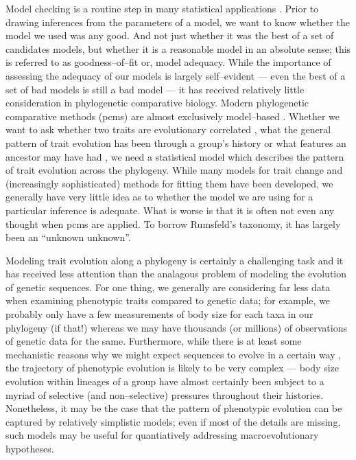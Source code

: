 \documentclass[12pt]{article}
\begin{document}
\noindent Model checking is a routine step in many statistical applications \citep[e.g.][ch. 6]{Gelmanbook}. Prior to drawing inferences from the parameters of a model, we want to know whether the model we used was any good. And not just whether it was the best of a set of candidates models, but whether it is a reasonable model in an absolute sense; this is referred to as goodness--of--fit or, model adequacy. While the importance of assessing the adequacy of our models is largely self--evident --- even the best of a set of bad models is still a bad model --- it has received relatively little consideration in phylogenetic comparative biology. Modern phylogenetic comparative methods (pcms) are almost exclusively model--based \citep[recently reviewed in][]{Omeara2012, PennellHarmon}. Whether we want to ask whether two traits are evolutionary correlated \citep[e.g.][]{Felsenstein1985, Grafen1989, HarveyPagel1991}, what the general pattern of trait evolution has been through a group's history \citep[e.g.][]{Mooers1999, Harmon2010, Hunt2012} or what features an ancestor may have had \citep[e.g.][]{Schluter1997, Huelsenbeck2003}, we need a statistical model which describes the pattern of trait evolution across the phylogeny. While many models for trait change and (increasingly sophisticated) methods for fitting them have been developed, we generally have very little idea as to whether the model we are using for a particular inference is adequate. What is worse is that it is often not even any thought when pcms are applied. To borrow Rumsfeld's taxonomy, it has largely been an ``unknown unknown''.

Modeling trait evolution along a phylogeny is certainly a challenging task and it has received less attention than the analagous problem of modeling the evolution of genetic sequences. For one thing, we generally are considering far less data when examining phenotypic traits compared to genetic data; for example, we probably only have a few  measurements of body size for each taxa in our phylogeny (if that!) whereas we may have thousands (or millions) of observations of genetic data for the same. Furthermore, while there is at least some mechanistic reasons why we might expect sequences to evolve in a certain way \citep{Kimura1983, Ohna1970, Wakeley2008}, the trajectory of phenotypic evolution is likely to be very complex --- body size evolution within lineages of a group have almost certainly been subject to a myriad of selective (and non--selective) pressures throughout their histories. Nonetheless, it may be the case that the pattern of phenotypic evolution can be captured by relatively simplistic models; even if most of the details are missing, such models may be useful for quantiatively addressing macroevolutionary hypotheses. 
\end{document}
